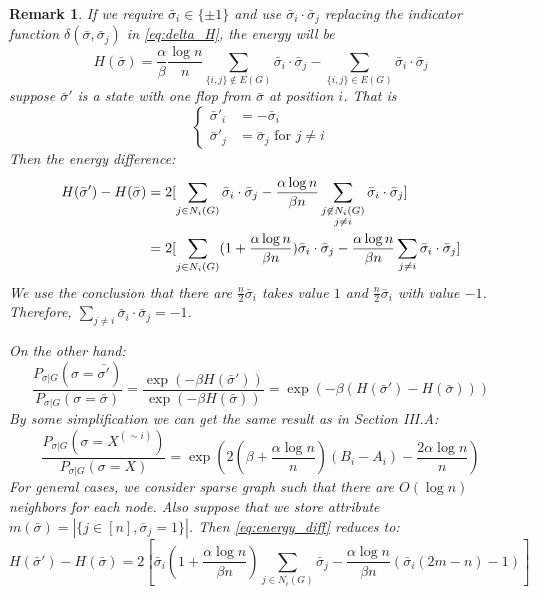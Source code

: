 \documentclass{article}
\newtheorem{remark}{Remark}
\begin{document}
	\begin{remark}
	If we require $\bar{\sigma}_i \in \{\pm 1\}$ and use $\bar{\sigma}_i \cdot \bar{\sigma}_j$ replacing
	the indicator function  $\delta(\bar{\sigma},\bar{\sigma}_j)$ in \eqref{eq:delta_H}, the energy will be
	$$
	H(\bar{\sigma}) = \frac{\alpha}{\beta} \frac{\log n}{n} \sum_{\{i,j\}\not\in E(G)}\bar{\sigma}_i \cdot \bar{\sigma}_j
		- \sum_{\{i,j\}\in E(G)}\bar{\sigma}_i \cdot \bar{\sigma}_j
	 $$
	 suppose $\bar{\sigma}'$ is a state with one flop from $\bar{\sigma}$ at position $i$. That is
	 $$
	 \begin{cases}
	 \bar{\sigma}'_i &= -\bar{\sigma}_i \\
	 \bar{\sigma}'_j & = \bar{\sigma}_j \textrm{ for } j \neq i
	 \end{cases}
	 $$
	 Then the energy difference:
	 \begin{align}
	 H(\bar{\sigma}') - H(\bar{\sigma}) &= 2[\sum_{j\in N_i(G)}\bar{\sigma}_i \cdot \bar{\sigma}_j - \frac{\alpha \log n}{\beta n}
	 \sum_{\substack{j\not\in N_i(G) \\ j\neq i}} \bar{\sigma}_i \cdot \bar{\sigma}_j ] \notag\\
	 & = 2 [\sum_{j\in N_i(G)}(1+\frac{\alpha \log n}{\beta n})\bar{\sigma}_i \cdot \bar{\sigma}_j - \frac{\alpha \log n}{\beta n}
	 \sum_{j\neq i} \bar{\sigma}_i \cdot \bar{\sigma}_j ] \label{eq:energy_diff}
	 \end{align}
	 We use the conclusion that there are $\frac{n}{2} \bar{\sigma}_i$ takes value $1$ and $\frac{n}{2}\bar{\sigma}_i$ with value
	 $-1$. Therefore, $\sum_{j\neq i} \bar{\sigma}_i \cdot\bar{\sigma}_j = -1$.
	 
	 On the other hand:
	 $$
	 \frac{P_{\sigma | G}(\sigma = \bar{\sigma'})}{P_{\sigma | G}(\sigma = \bar{\sigma})}
	 = \frac{\exp(-\beta H(\bar{\sigma}'))}{\exp(-\beta H(\bar{\sigma}))} = \exp(-\beta(H(\bar{\sigma}')-H(\bar{\sigma})))
	 $$
	 By some simplification we can get the same result as \cite{ye2020exact} in Section III.A:
	 $$
	 \frac{P_{\sigma |G }(\sigma = X^{(\sim i)})}{P_{\sigma |G }(\sigma = X)}
	 = \exp(2(\beta + \frac{\alpha \log n}{n})(B_i - A_i)-\frac{2\alpha \log n}{n})
	 $$
	 For general cases, we consider sparse graph such that there are $O(\log n)$ neighbors for each node.
	 Also suppose that we store  attribute $m(\bar{\sigma})= |\{j \in [n], \bar{\sigma}_j = 1 \}|$.
	 Then \eqref{eq:energy_diff} reduces to:
	 \begin{equation}
	 H(\bar{\sigma}') - H(\bar{\sigma}) = 2 [\bar{\sigma}_i(1+\frac{\alpha \log n}{\beta n}) \sum_{j\in N_i(G)}\bar{\sigma}_j - \frac{\alpha \log n}{\beta n}
	 (\bar{\sigma}_i (2m-n)-1) ]
	 \end{equation}
	\end{remark}
\end{document}
